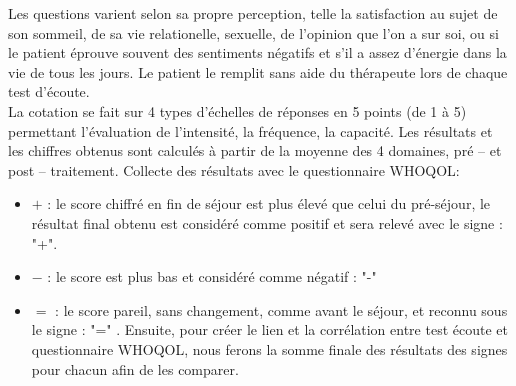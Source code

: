 Les questions varient selon sa propre perception, telle la satisfaction
au sujet de son  sommeil, de sa vie relationelle, sexuelle, de
l'opinion que l'on a sur soi, ou si le patient éprouve souvent des sentiments négatifs
et s'il a assez d'énergie dans la vie de tous les jours.
Le patient le remplit sans aide du
thérapeute lors de chaque test
d'écoute.
\\
La cotation se fait sur 4 types d'échelles de réponses en 5 points (de 1 à 5)
permettant l'évaluation de l'intensité, la fréquence, la capacité.
Les résultats et les chiffres obtenus  sont calculés à partir de la moyenne des 4
domaines, pré -- et post -- traitement.
Collecte des résultats avec le questionnaire WHOQOL:	
\begin{itemize}
	\item$+$  :  le score chiffré  en fin de séjour est plus élevé
	que celui du
	pré-séjour, le résultat final obtenu est considéré comme
	positif et sera relevé  avec le signe : "+". 
	\item $-$ : le score est plus bas et considéré comme négatif : "-"  
	\item$=$ : le score pareil, sans changement,  comme avant le séjour, et reconnu sous le signe :  "=" .
	Ensuite, pour créer le lien et la corrélation entre test écoute et questionnaire WHOQOL, nous ferons la 
	somme finale des résultats des signes pour chacun afin de les comparer.
\end{itemize}
